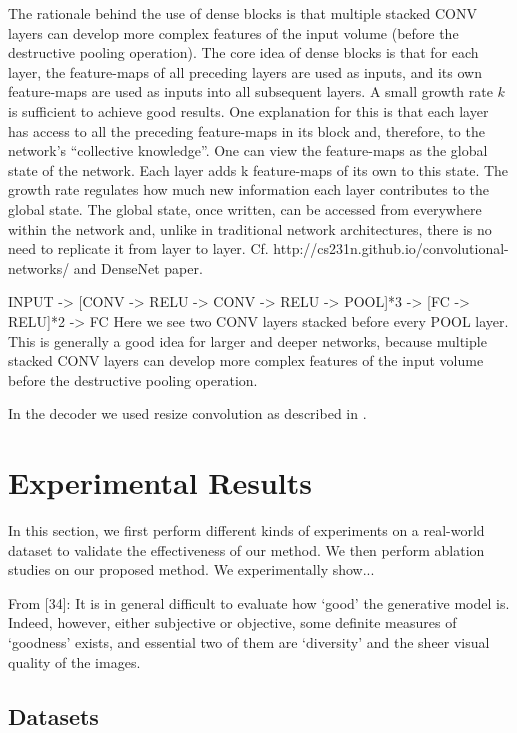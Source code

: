 \documentclass[12pt,a4paper]{article}
\begin{document}
\par The rationale behind the use of dense blocks is that multiple stacked CONV layers can develop more complex features of the input volume (before the destructive pooling operation). The core idea of dense blocks is that for each layer, the feature-maps of all preceding layers are used as inputs, and its own feature-maps are used as inputs into all subsequent layers. A small growth rate $k$ is sufficient to achieve good results. One explanation for this is that each layer has access to all the preceding feature-maps in its block and, therefore, to the network’s “collective knowledge”. One can view the feature-maps as the global state of the network. Each layer adds k feature-maps of its own to this state. The growth rate regulates how much new information each layer contributes to the global state. The global state, once written, can be accessed from everywhere within the network and, unlike in traditional network architectures, there is no need to replicate it from layer to layer.
Cf. http://cs231n.github.io/convolutional-networks/ and DenseNet paper.

\par INPUT -> [CONV -> RELU -> CONV -> RELU -> POOL]*3 -> [FC -> RELU]*2 -> FC
Here we see two CONV layers stacked before every POOL layer. This is generally a good
idea for larger and deeper networks, because multiple stacked CONV layers can develop
more complex features of the input volume before the destructive pooling operation.

\par In the decoder we used resize convolution as described in \cite{odena_dumoulin_olah_2016}.

\section{Experimental Results}
In this section, we first perform different kinds of experiments on a real-world dataset to validate the
effectiveness of our method. We then perform ablation studies on our proposed
method. 
We experimentally show...

From [34]: It is in general difficult to evaluate how ‘good’ the generative model is. Indeed, however, either subjective or objective, some definite measures of ‘goodness’ exists, and essential two of them are ‘diversity’ and the sheer visual quality of the images.
    
\subsection{Datasets}
\end{document}
